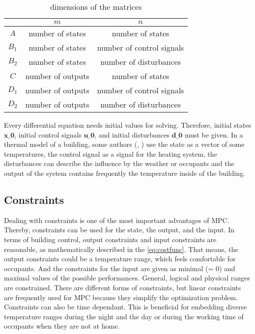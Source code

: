     \begin{table}[]
        \centering
        \begin{tabular}{c|c|c}
            & $m$ & $n$  \\
            \hline
            $A$ & number of states & number of states\\
            $B_\text{1}$ & number of states & number of control signals\\
            $B_\text{2}$ & number of states & number of disturbances\\
            $C$ & number of outputs & number of states\\
            $D_\text{1}$ & number of outputs & number of control signals\\
            $D_\text{2}$ & number of outputs & number of disturbances\\
        \end{tabular}
        \caption{dimensions of the matrices}
        \label{tab:matrixDim}
    \end{table}
    Every differential equation needs initial values for solving. Therefore, initial states $\textbf{x_0}$, initial control signals $\textbf{u_0}$, and initial disturbances $\textbf{d_0}$ must be given.
    In a thermal model of a building, some authors (\cite{Hazyuk.2012}, \cite{Siroky.2011}) use the state as a vector of some temperatures, the control signal as a signal for the heating system, the disturbances can describe the influence by the weather or occupants and the output of the system contains frequently the temperature inside of the building.
    


\subsection{Constraints}
\label{subsection:constraints}

Dealing with constraints is one of the most important advantages of MPC. Thereby, constraints can be used for the state, the output, and the input. In terms of building control, output constraints and input constraints are reasonable, as mathematically described in the \autoref{eq:costfunc}. That means, the output constraints could be a temperature range, which feels comfortable for occupants. And the constraints for the input are given as minimal (= 0) and maximal values of the possible performances. General, logical and physical ranges are constrained. There are different forms of constraints, but linear constraints are frequently used for MPC because they simplify the optimization problem. Constraints can also be time dependant. This is beneficial for embedding diverse temperature ranges during the night and the day or during the working time of occupants when they are not at home.
\cite{Siroky.2011}
